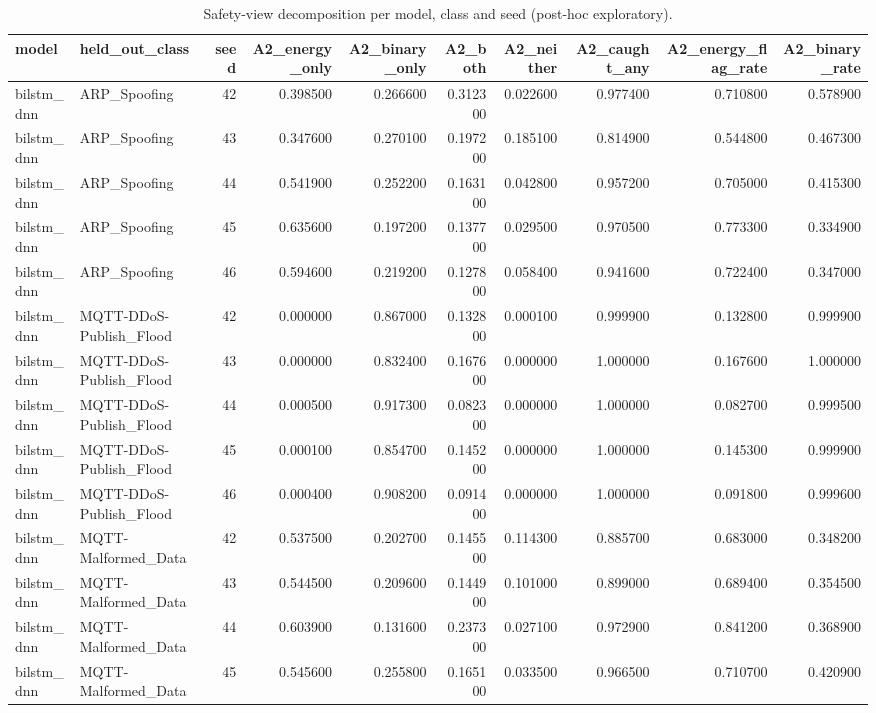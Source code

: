 \begin{table}
\caption{Safety-view decomposition per model, class and seed (post-hoc exploratory).}
\label{tab:supp_decomp}
\begin{tabular}{llrrrrrrrr}
\toprule
model & held\_out\_class & seed & A2\_energy\_only & A2\_binary\_only & A2\_both & A2\_neither & A2\_caught\_any & A2\_energy\_flag\_rate & A2\_binary\_rate \\
\midrule
bilstm\_dnn & ARP\_Spoofing & 42 & 0.398500 & 0.266600 & 0.312300 & 0.022600 & 0.977400 & 0.710800 & 0.578900 \\
bilstm\_dnn & ARP\_Spoofing & 43 & 0.347600 & 0.270100 & 0.197200 & 0.185100 & 0.814900 & 0.544800 & 0.467300 \\
bilstm\_dnn & ARP\_Spoofing & 44 & 0.541900 & 0.252200 & 0.163100 & 0.042800 & 0.957200 & 0.705000 & 0.415300 \\
bilstm\_dnn & ARP\_Spoofing & 45 & 0.635600 & 0.197200 & 0.137700 & 0.029500 & 0.970500 & 0.773300 & 0.334900 \\
bilstm\_dnn & ARP\_Spoofing & 46 & 0.594600 & 0.219200 & 0.127800 & 0.058400 & 0.941600 & 0.722400 & 0.347000 \\
bilstm\_dnn & MQTT-DDoS-Publish\_Flood & 42 & 0.000000 & 0.867000 & 0.132800 & 0.000100 & 0.999900 & 0.132800 & 0.999900 \\
bilstm\_dnn & MQTT-DDoS-Publish\_Flood & 43 & 0.000000 & 0.832400 & 0.167600 & 0.000000 & 1.000000 & 0.167600 & 1.000000 \\
bilstm\_dnn & MQTT-DDoS-Publish\_Flood & 44 & 0.000500 & 0.917300 & 0.082300 & 0.000000 & 1.000000 & 0.082700 & 0.999500 \\
bilstm\_dnn & MQTT-DDoS-Publish\_Flood & 45 & 0.000100 & 0.854700 & 0.145200 & 0.000000 & 1.000000 & 0.145300 & 0.999900 \\
bilstm\_dnn & MQTT-DDoS-Publish\_Flood & 46 & 0.000400 & 0.908200 & 0.091400 & 0.000000 & 1.000000 & 0.091800 & 0.999600 \\
bilstm\_dnn & MQTT-Malformed\_Data & 42 & 0.537500 & 0.202700 & 0.145500 & 0.114300 & 0.885700 & 0.683000 & 0.348200 \\
bilstm\_dnn & MQTT-Malformed\_Data & 43 & 0.544500 & 0.209600 & 0.144900 & 0.101000 & 0.899000 & 0.689400 & 0.354500 \\
bilstm\_dnn & MQTT-Malformed\_Data & 44 & 0.603900 & 0.131600 & 0.237300 & 0.027100 & 0.972900 & 0.841200 & 0.368900 \\
bilstm\_dnn & MQTT-Malformed\_Data & 45 & 0.545600 & 0.255800 & 0.165100 & 0.033500 & 0.966500 & 0.710700 & 0.420900 \\

\end{tabular}
\end{table}
